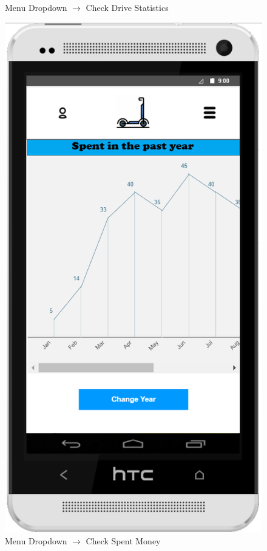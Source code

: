 \documentclass[a4paper, 12pt]{article}
\begin{document}
\begin{figure} [htbp]
\begin{center}
\begin{minipage}{0.45\textwidth}
\begin{center}
            \end{center}
            \caption{Menu Dropdown $\rightarrow$ Check Drive Statistics}
        \end{minipage}\hfill
        \begin{minipage}{0.45\textwidth}
            \begin{center}
                \includegraphics[scale=0.59]{images/prototypes/02-04-menu-dropdown--check-spent-money.png}
            \end{center}
            \caption{Menu Dropdown $\rightarrow$ Check Spent Money}
        \end{minipage}
    \end{center}
\end{figure}
\end{document}
